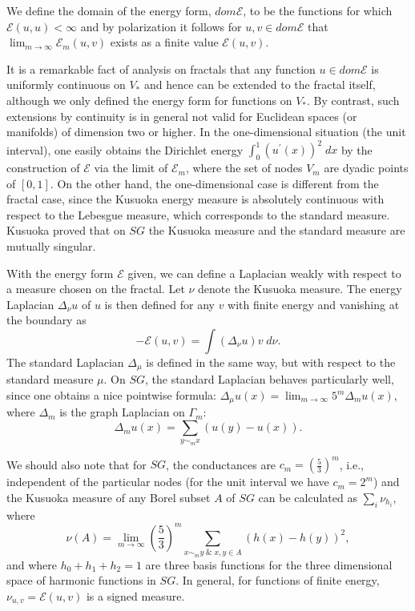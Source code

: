 \documentclass[11pt]{scrartcl}
\theoremstyle{plain} %
\theoremstyle{definition}
\begin{document}
We define the domain of the energy form, $dom{\mathcal E}$, to be the functions for which ${\mathcal E}(u,u)<\infty$ and by polarization it follows for $u,v\in dom {\mathcal E}$ that $\lim_{m\to \infty} {\mathcal E}_m(u,v)$ exists as a finite value ${\mathcal E}(u,v)$.

It is a remarkable fact of analysis on fractals that any function $u\in dom{\mathcal E}$ is uniformly continuous on $V_{*}$ and hence can be extended to the fractal itself, although we only defined the energy form for functions on $V_{*}$.  By contrast, such extensions by continuity is in general not valid for Euclidean spaces (or manifolds) of dimension two or higher. In the one-dimensional situation (the unit interval), one easily obtains the Dirichlet energy $\int_0^1 (u^{\prime}(x))^2 \; dx$ by the construction of ${\mathcal E}$ via the limit of ${\mathcal E}_m$, where the set of nodes $V_m$ are dyadic points of $[0,1]$. On the other hand, the one-dimensional case is different from the fractal case, since the Kusuoka energy measure is absolutely continuous with respect to the Lebesgue measure, which corresponds to the standard measure. Kusuoka proved that on $SG$ the Kusuoka measure and the standard measure are mutually singular.

With the energy form ${\mathcal E}$ given, we can define a Laplacian weakly with respect to a measure chosen on the fractal. Let $\nu$ denote the Kusuoka measure. The energy Laplacian $\Delta_{\nu}u$ of $u$ is then defined for any $v$ with finite energy and vanishing at the boundary as
$$-{\mathcal E}(u,v)=\int (\Delta_{\nu} u) v\; d\nu.$$
The standard Laplacian $\Delta_{\mu}$ is defined in the same way, but with respect to the standard measure $\mu$. On $SG$, the standard Laplacian behaves particularly well, since one obtains a nice pointwise formula: $\Delta_{\mu}u(x)=\lim_{m\to \infty} 5^m \Delta_m u(x)$, where $\Delta_m$ is the graph Laplacian on $\Gamma_m$:
$$ \Delta_m u(x)=\sum_{y\sim_m x} (u(y)-u(x)).$$

We should also note that for $SG$, the conductances are $c_m=\left(\frac{5}{3}\right)^m$, i.e., independent of the particular nodes (for the unit interval we have $c_m=2^m$) and the Kusuoka measure of any Borel subset $A$ of $SG$ can be calculated as $\sum_i \nu_{h_i}$, where
$$\nu(A)=\lim_{m\to \infty} \left(\frac{5}{3}\right)^m \sum_{x \sim_m y\;  \& \; x,y\in A} \left(h(x)-h(y)\right)^2,$$
and where $h_0+h_1+h_2=1$ are three basis functions for the three dimensional space of harmonic functions in $SG$. In general, for functions of finite energy, $\nu_{u,v}={\mathcal E}(u,v)$ is a signed measure. 
\end{document}
